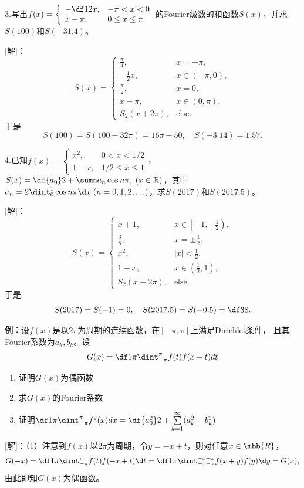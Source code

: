 3.写出$f(x)=\left\{\begin{array}{ll}
	-\df12x,&-\pi<x<0\\ x-\pi,&0\leq x\leq \pi
\end{array}\right.$的Fourier级数的和函数$S(x)$，并求$S(100)$和$S(-31.4)$。

[解]：
$$S(x)=\left\{\begin{array}{ll}
	\frac{\pi}4, & x=-\pi,\\
	-\frac12x, & x\in(-\pi,0),\\
	\frac{\pi}2, & x=0,\\
	x-\pi, & x\in(0,\pi),\\
	S_2(x+2\pi), & \mathrm{else}.
\end{array}\right.$$
于是
$$S(100)=S(100-32\pi)=16\pi-50,\quad
S(-3.14)=1.57.$$
\fin

\bs

4.已知$f(x)=\left\{\begin{array}{ll}
	x^2,&0<x<1/2\\ 1-x,&1/2\leq x\leq 1
\end{array}\right.$，
$S(x)=\df{a_0}2+\sumn a_n\cos n\pi,\;(x\in\mathbb{R})$，其中
$a_n=2\dint_0^1\cos n\pi\d x\;(n=0,1,2,\ldots)$，求$S(2017)$和$S(2017.5)$。

[解]：
$$S(x)=\left\{\begin{array}{ll}
	x+1, & x\in\left[-1,-\frac12\right),\\
	\frac38, & x=\pm\frac12,\\
	x^2, & |x|<\frac12,\\
	1-x, & x\in\left(\frac12,1\right),\\
	S_2(x+2\pi), & \mathrm{else}.
\end{array}\right.$$
于是
$$S(2017)=S(-1)=0,\quad
S(2017.5)=S(-0.5)=\df38.$$
\fin

\newpage

{\bf 例：}设$f(x)$是以$2\pi$为周期的连续函数，在$[-\pi,\pi]$上满足Dirichlet条件，
且其Fourier系数为$a_k,b_k$。设
$$G(x)=\df1{\pi}\dint_{-\pi}^{\pi}f(t)f(x+t)dt$$
\begin{enumerate}[(1)]
  \item 证明$G(x)$为偶函数
  \item 求$G(x)$的Fourier系数
  \item 证明$\df1{\pi}\dint_{-\pi}^{\pi}f^2(x)dx=\df{a_0^2}2+
  \sum\limits_{k=1}^{\infty}(a_k^2+b_k^2)$
\end{enumerate}

[解]：（1）注意到$f(x)$以$2\pi$为周期，令$y=-x+t$，则对任意$x\in\mbb{R}$，
$$G(-x)=\df1{\pi}\dint_{-\pi}^{\pi}f(t)f(-x+t)\d t
=\df1{\pi}\dint_{-x-\pi}^{-x+\pi}f(x+y)f(y)\d y=G(x),$$
由此即知$G(x)$为偶函数。


